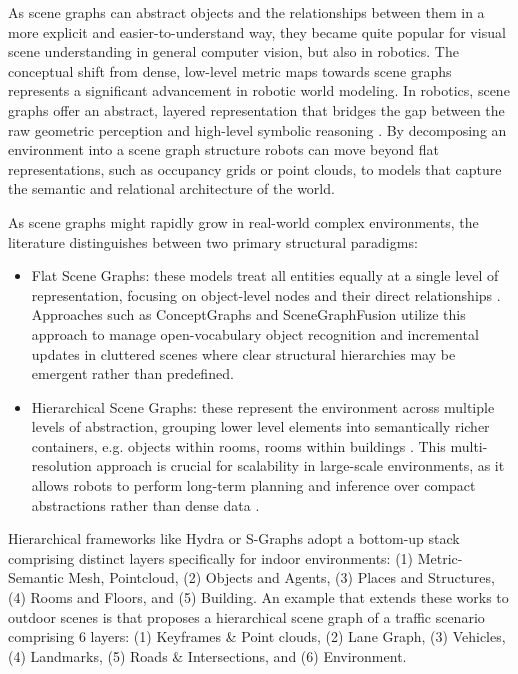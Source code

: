 As scene graphs can abstract objects and the relationships between them in a more explicit and easier-to-understand way, they became quite popular for visual scene understanding in general computer vision, but also in robotics. The conceptual shift from dense, low-level metric maps towards scene graphs represents a significant advancement in robotic world modeling. In robotics, scene graphs offer an abstract, layered representation that bridges the gap between the raw geometric perception and high-level symbolic reasoning \cite{bavle_slam_2023}. By decomposing an environment into a scene graph structure robots can move beyond flat representations, such as occupancy grids or point clouds, to models that capture the semantic and relational architecture of the world.  

As scene graphs might rapidly grow in real-world complex environments, the literature distinguishes between two primary structural paradigms: 
\begin{itemize}
    \item Flat Scene Graphs: these models treat all entities equally at a single level of representation, focusing on object-level nodes and their direct relationships \cite{catalano_3d_2025}. Approaches such as ConceptGraphs\cite{gu_conceptgraphs_2023} and SceneGraphFusion\cite{wu_scenegraphfusion_2021} utilize this approach to manage open-vocabulary object recognition and incremental updates in cluttered scenes where clear structural hierarchies may be emergent rather than predefined. 
    \item Hierarchical Scene Graphs: these represent the environment across multiple levels of abstraction, grouping lower level elements into semantically richer containers, e.g. objects within rooms, rooms within buildings\cite{rosinol_3d_2020} \cite{bavle_s-graphs_2025}. This multi-resolution approach is crucial for scalability in large-scale environments, as it allows robots to perform long-term planning and inference over compact abstractions rather than dense data \cite{catalano_3d_2025}.  
\end{itemize}
Hierarchical frameworks like Hydra \cite{hughes_hydra_2022} or S-Graphs\cite{bavle_s-graphs_2025} adopt a bottom-up stack comprising distinct layers specifically for indoor environments: (1) Metric-Semantic Mesh, Pointcloud, (2) Objects and Agents, (3) Places and Structures, (4) Rooms and Floors, and (5) Building. An example that extends these works to outdoor scenes is  \cite{greve_collaborative_2024} that proposes a hierarchical scene graph of a traffic scenario comprising 6 layers: (1) Keyframes \& Point clouds, (2) Lane Graph, (3) Vehicles, (4) Landmarks, (5) Roads \& Intersections, and (6) Environment.

